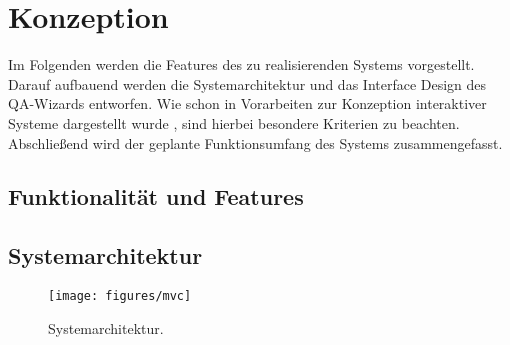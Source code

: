 \documentclass[11pt,        %
  english,ngerman,          %
  paper=a4,                 %
  captions=tablesignature,  %
  listof=numbered,          %
  bibliography=totoc,       %
  headings=small,           %
  headinclude=false,        %
  footinclude=false,        %
  parskip=half-,            %
  oneside,                  %
  BCOR=15mm,                 %
  DIV=12                    %
  ]{scrbook}                %
\begin{document}
\chapter{Konzeption}\label{chapter:concept}


Im Folgenden werden die Features des zu realisierenden Systems vorgestellt. Darauf aufbauend werden die Systemarchitektur und das Interface Design des QA-Wizards entworfen. Wie schon in Vorarbeiten zur Konzeption interaktiver Systeme dargestellt wurde \citep{herczeg-2009-software_ergonomie}, sind hierbei besondere Kriterien zu beachten. Abschließend wird der geplante Funktionsumfang des Systems zusammengefasst.

\section{Funktionalität und Features}\label{sec:concept_features}


\section{Systemarchitektur}\label{sec:concept_architecture}


\begin{figure}[htb]
  \begin{center}
    \texttt{[image: figures/mvc]}
  \end{center}
  \caption{Systemarchitektur.}
  \label{fig:mvc}
\end{figure}
\end{document}
